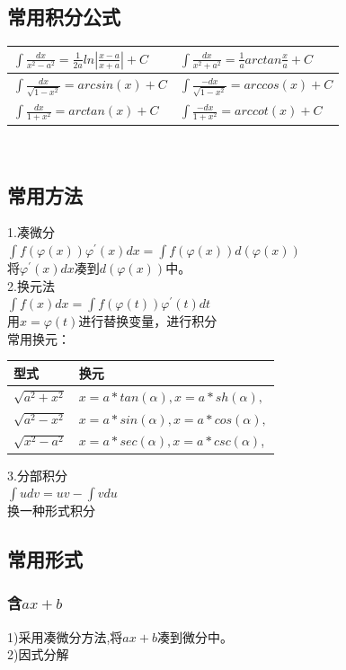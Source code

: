 \documentclass[fleqn]{article}
\begin{document}
\begin{flushleft}
	\subsection{常用积分公式}
		\begin{tabular}{|l|l|}
			\hline
			$\int \frac{dx}{x^2-a^2}=\frac{1}{2a}ln|\frac{x-a}{x+a}|+C$ & $\int \frac{dx}{x^2+a^2}=\frac{1}{a}arctan\frac{x}{a}+C$\\
			\hline
		$\int \frac{dx}{\sqrt{1-x^2}}=arcsin(x)+C$ & $\int \frac{-dx}{\sqrt{1-x^2}}=arccos(x)+C$\\
			\hline
		 $\int \frac{dx}{1+x^2}=arctan(x)+C$ & $\int \frac{-dx}{1+x^2}=arccot(x)+C$\\
		\hline
		\end{tabular}\\


	\subsection{常用方法}
		1.凑微分\\
		$\int f(\varphi(x))\varphi^{'}(x)dx=\int f(\varphi(x))d(\varphi(x))$\\
		将$\varphi^{'}(x)dx$凑到$d(\varphi(x))$中。\\
		2.换元法\\
		$\int f(x)dx=\int f(\varphi(t))\varphi^{'}(t)dt$\\
		用$x=\varphi(t)$进行替换变量，进行积分\\
		常用换元：\\
		\begin{tabular}{|l|l|}
\hline
			型式 & 换元\\
\hline
			$\sqrt{a^2+x^2}$ & $x=a*tan(\alpha),x=a*sh(\alpha),$\\
			$\sqrt{a^2-x^2}$ & $x=a*sin(\alpha),x=a*cos(\alpha),$\\
			$\sqrt{x^2-a^2}$ & $x=a*sec(\alpha),x=a*csc(\alpha)$,\\
\hline
		\end{tabular}

		3.分部积分\\
		$\int udv=uv-\int vdu$\\
		换一种形式积分
	\subsection{常用形式}
		\subsubsection{含$ax+b$}
		1)采用凑微分方法,将$ax+b$凑到微分中。\\
		2)因式分解\\

\end{flushleft}
\end{document}
